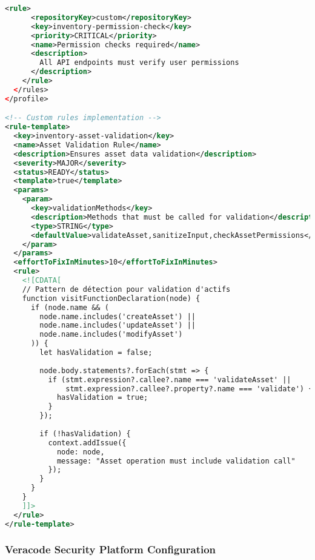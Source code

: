 \documentclass[12pt,a4paper]{report}
\begin{document}
\begin{lstlisting}[language=XML, caption=Configuration SonarQube avancée avec règles métier]
    <rule>
      <repositoryKey>custom</repositoryKey>
      <key>inventory-permission-check</key>
      <priority>CRITICAL</priority>
      <name>Permission checks required</name>
      <description>
        All API endpoints must verify user permissions
      </description>
    </rule>
  </rules>
</profile>

<!-- Custom rules implementation -->
<rule-template>
  <key>inventory-asset-validation</key>
  <name>Asset Validation Rule</name>
  <description>Ensures asset data validation</description>
  <severity>MAJOR</severity>
  <status>READY</status>
  <template>true</template>
  <params>
    <param>
      <key>validationMethods</key>
      <description>Methods that must be called for validation</description>
      <type>STRING</type>
      <defaultValue>validateAsset,sanitizeInput,checkAssetPermissions</defaultValue>
    </param>
  </params>
  <effortToFixInMinutes>10</effortToFixInMinutes>
  <rule>
    <![CDATA[
    // Pattern de détection pour validation d'actifs
    function visitFunctionDeclaration(node) {
      if (node.name && (
        node.name.includes('createAsset') || 
        node.name.includes('updateAsset') ||
        node.name.includes('modifyAsset')
      )) {
        let hasValidation = false;
        
        node.body.statements?.forEach(stmt => {
          if (stmt.expression?.callee?.name === 'validateAsset' ||
              stmt.expression?.callee?.property?.name === 'validate') {
            hasValidation = true;
          }
        });
        
        if (!hasValidation) {
          context.addIssue({
            node: node,
            message: "Asset operation must include validation call"
          });
        }
      }
    }
    ]]>
  </rule>
</rule-template>
\end{lstlisting}

\subsubsection{Veracode Security Platform Configuration}
\end{document}
